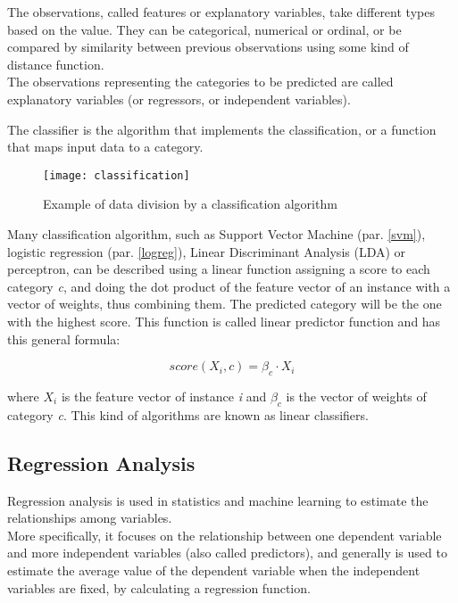The observations, called features or explanatory variables, take different types based on the value. They can be categorical, numerical or ordinal, or be compared by similarity between previous observations using some kind of distance function.\\
The observations representing the categories to be predicted are called explanatory variables (or regressors, or independent variables).

The classifier is the algorithm that implements the classification, or a function that maps input data to a category.

\begin{figure}[H]
	\centering
	\texttt{[image: classification]}
	\caption{Example of data division by a classification algorithm}
	\label{fig:classification}
\end{figure}	

Many classification algorithm, such as Support Vector Machine (par. \ref{svm}), logistic regression (par. \ref{logreg}), Linear Discriminant Analysis (LDA) or perceptron, can be described using a linear function assigning a score to each category \textit{c}, and doing the dot product of the feature vector of an instance with a vector of weights, thus combining them. The predicted category will be the one with the highest score. This function is called linear predictor function and has this general formula:

\begin{equation}
score(X_i, c) = \beta_c \cdot X_i
\end{equation}

where $X_i$ is the feature vector of instance \textit{i} and $\beta_c$ is the vector of weights of category \textit{c}. This kind of algorithms are known as linear classifiers.

\subsection{Regression Analysis} \label{regression}

Regression analysis is used in statistics and machine learning to estimate the relationships among variables. \\
More specifically, it focuses on the relationship between one dependent variable and more independent variables (also called predictors), and generally is used to estimate the average value of the dependent variable when the independent variables are fixed, by calculating a regression function.

